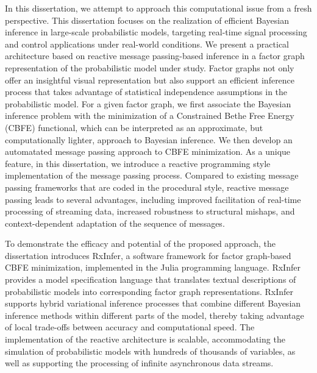 In this dissertation, we attempt to approach this computational issue from a fresh perspective. 
This dissertation focuses on the realization of efficient Bayesian inference in large-scale probabilistic models, targeting real-time signal processing and control applications under real-world conditions.
We present a practical architecture based on reactive message passing-based inference in a factor graph representation of the probabilistic model under study.
Factor graphs not only offer an insightful visual representation but also support an efficient inference process that takes advantage of statistical independence assumptions in the probabilistic model.
For a given factor graph, we first associate the Bayesian inference problem with the minimization of a Constrained Bethe Free Energy (CBFE) functional, which can be interpreted as an approximate, but computationally lighter, approach to Bayesian inference. We then develop an automatated message passing approach to CBFE minimization. As a unique feature, in this dissertation, we introduce a reactive programming style implementation of the message passing process. 
Compared to existing message passing frameworks that are coded in the procedural style, reactive message passing leads to several advantages, including improved facilitation of real-time processing of streaming data, increased robustness to structural mishaps, and context-dependent adaptation of the sequence of messages. %

To demonstrate the efficacy and potential of the proposed approach, the dissertation introduces RxInfer, a software framework for factor graph-based CBFE minimization, implemented in the Julia programming language.
RxInfer provides a model specification language that translates textual descriptions of probabilistic models into corresponding factor graph representations.
RxInfer supports hybrid variational inference processes that combine different Bayesian inference methods within different parts of the model, thereby taking advantage of local trade-offs between accuracy and computational speed.
The implementation of the reactive architecture is scalable, accommodating the simulation of probabilistic models with hundreds of thousands of variables, as well as supporting the processing of infinite asynchronous data streams.


